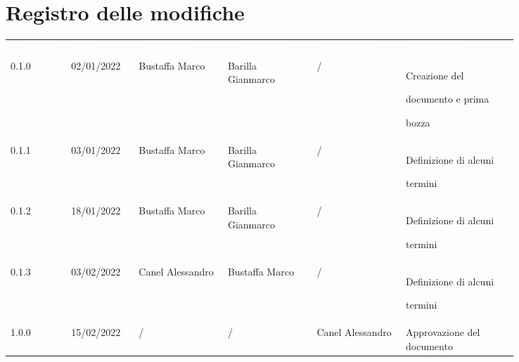\section*{Registro delle modifiche}

{\renewcommand{\arraystretch}{1.5}
\scriptsize
\begin{tabular}{p{0.10\linewidth}p{0.10\linewidth}p{0.15\linewidth}p{0.15\linewidth}p{0.15\linewidth}p{0.19\linewidth}}
	\rowcolor[RGB]{33, 73, 50}
	\textcolor{white}{\textbf{Versione}} & \textcolor{white}{\textbf{Data}} &
	\textcolor{white}{\textbf{Redattore}} & \textcolor{white}{\textbf{Verificatore}} &
	\textcolor{white}{\textbf{Approvatore}} & \textcolor{white}{\textbf{Descrizione}}\\
	\rowcolor[RGB]{216, 235, 171}
	0.1.0 & 02/01/2022 & Bustaffa Marco & Barilla Gianmarco &/& Creazione del \par documento  e prima \par bozza\\
	\rowcolor[RGB]{233, 245, 206}
	0.1.1 & 03/01/2022 & Bustaffa Marco & Barilla Gianmarco &/& Definizione di alcuni \par termini\\
	\rowcolor[RGB]{216, 235, 171}
	0.1.2 & 18/01/2022 & Bustaffa Marco & Barilla Gianmarco &/& Definizione di alcuni \par termini\\
	\rowcolor[RGB]{233, 245, 206}
	0.1.3 & 03/02/2022 & Canel Alessandro & Bustaffa Marco &/& Definizione di alcuni \par termini\\
	\rowcolor[RGB]{216, 235, 171}
	1.0.0 & 15/02/2022 & / & / & Canel Alessandro& Approvazione del documento\\
\end{tabular}
}
